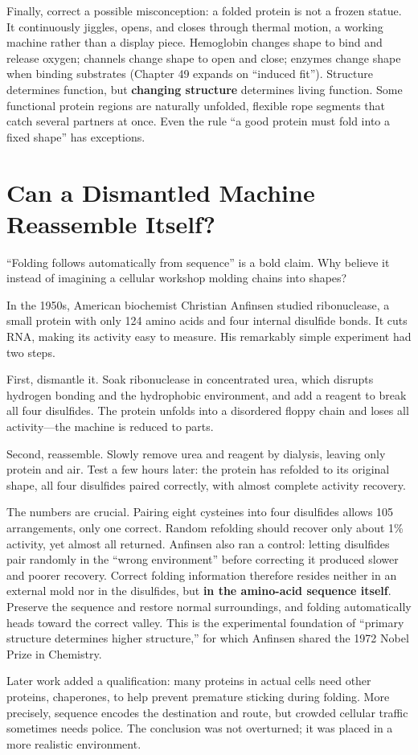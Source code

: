 Finally, correct a possible misconception: a folded protein is not a frozen statue. It continuously jiggles, opens, and closes through thermal motion, a working machine rather than a display piece. Hemoglobin changes shape to bind and release oxygen; channels change shape to open and close; enzymes change shape when binding substrates (Chapter 49 expands on ``induced fit''). Structure determines function, but \textbf{changing structure} determines living function. Some functional protein regions are naturally unfolded, flexible rope segments that catch several partners at once. Even the rule ``a good protein must fold into a fixed shape'' has exceptions.

\section{Can a Dismantled Machine Reassemble Itself?}

``Folding follows automatically from sequence'' is a bold claim. Why believe it instead of imagining a cellular workshop molding chains into shapes?

\begin{zhengju}
In the 1950s, American biochemist Christian Anfinsen studied ribonuclease, a small protein with only 124 amino acids and four internal disulfide bonds. It cuts RNA, making its activity easy to measure. His remarkably simple experiment had two steps.

First, dismantle it. Soak ribonuclease in concentrated urea, which disrupts hydrogen bonding and the hydrophobic environment, and add a reagent to break all four disulfides. The protein unfolds into a disordered floppy chain and loses all activity---the machine is reduced to parts.

Second, reassemble. Slowly remove urea and reagent by dialysis, leaving only protein and air. Test a few hours later: the protein has refolded to its original shape, all four disulfides paired correctly, with almost complete activity recovery.

The numbers are crucial. Pairing eight cysteines into four disulfides allows 105 arrangements, only one correct. Random refolding should recover only about 1\% activity, yet almost all returned. Anfinsen also ran a control: letting disulfides pair randomly in the ``wrong environment'' before correcting it produced slower and poorer recovery. Correct folding information therefore resides neither in an external mold nor in the disulfides, but \textbf{in the amino-acid sequence itself}. Preserve the sequence and restore normal surroundings, and folding automatically heads toward the correct valley. This is the experimental foundation of ``primary structure determines higher structure,'' for which Anfinsen shared the 1972 Nobel Prize in Chemistry.

Later work added a qualification: many proteins in actual cells need other proteins, chaperones, to help prevent premature sticking during folding. More precisely, sequence encodes the destination and route, but crowded cellular traffic sometimes needs police. The conclusion was not overturned; it was placed in a more realistic environment.
\end{zhengju}

